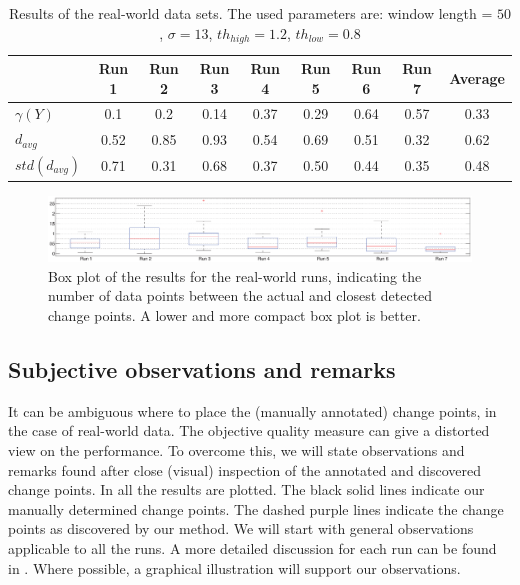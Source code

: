 \begin{table}
  \centering
  \caption[Results real world runs]{Results of the real-world data sets. The used parameters are: window length = $50$, $\sigma = 13$, $th_{high} = 1.2$, $th_{low} = 0.8$}
  \begin{tabulary}{\textwidth}{|l|c|c|c|c|c|c|c||c|}
     & Run 1 & Run 2 & Run 3 & Run 4 & Run 5 & Run 6 & Run 7 & Average \\
    \hline
    $\gamma(Y)$ & 0.1 & 0.2 & 0.14 & 0.37 & 0.29 & 0.64 & 0.57 & 0.33 \\
    \hline
    $d_{avg}$ & 0.52 & 0.85 & 0.93 & 0.54 & 0.69 & 0.51 & 0.32 & 0.62\\
    \hline
    $std(d_{avg})$ & 0.71 & 0.31 & 0.68 & 0.37 & 0.50 & 0.44 & 0.35 & 0.48 \\
    \hline
  \end{tabulary}
  \label{tab:results_final_real_world}
\end{table}

\begin{figure}
\centering
  \includegraphics[width=1\textwidth]{./Figures/chapter6/data_collection/boxplot_final_runs.eps}
  \caption[Box plot results real-world runs]{Box plot of the results for the real-world runs, indicating the number of data points between the actual and closest detected change points. A lower and more compact box plot is better.}
  \label{fig:boxplot_final_real_world_runs}
\end{figure}

\subsection{Subjective observations and remarks}\label{subsec:subjective_results}
It can be ambiguous where to place the (manually annotated) change points, in the case of real-world data.
The objective quality measure can give a distorted view on the performance.
To overcome this, we will state observations and remarks found after close (visual) inspection of the annotated and discovered change points.
In  all the results are plotted.
The black solid lines indicate our manually determined change points.
The dashed purple lines indicate the change points as discovered by our method.
We will start with general observations applicable to all the runs.
A more detailed discussion for each run can be found in .
Where possible, a graphical illustration will support our observations.

